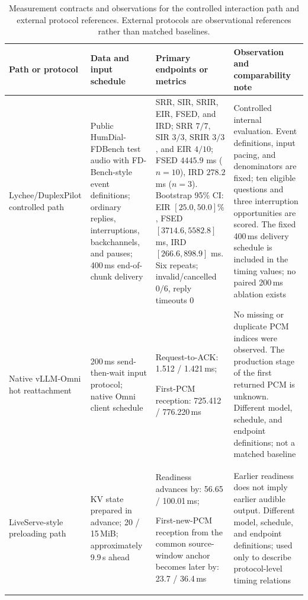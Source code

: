 \documentclass{article}
\begin{document}
\begin{table}[t]
\centering
\caption{Measurement contracts and observations for the controlled
interaction path and external protocol references. External protocols
are observational references rather than matched baselines.}
\label{tab:interaction_protocol}
\scriptsize
\setlength{\tabcolsep}{4pt}
\begin{tabular}{p{}
                p{}
                p{}
                p{}}
\toprule
Path or protocol
& Data and input schedule
& Primary endpoints or metrics
& Observation and comparability note \\
\midrule

Lychee/DuplexPilot
controlled path
&
Public HumDial-FDBench test audio with
FD-Bench-style event definitions; ordinary replies,
interruptions, backchannels, and pauses;
400\,ms end-of-chunk delivery
&
SRR, SIR, SRIR, EIR, FSED, and IRD;
SRR $7/7$, SIR $3/3$, SRIR $3/3$, and
EIR $4/10$; FSED $4445.9$ ms ($n=10$),
IRD $278.2$ ms ($n=3$). Bootstrap 95\%
CI: EIR $[25.0,50.0]\%$, FSED
$[3714.6,5582.8]$ ms, IRD
$[266.6,898.9]$ ms. Six repeats;
invalid/cancelled $0/6$, reply timeouts $0$
&
Controlled internal evaluation.
Event definitions, input pacing, and
denominators are fixed; ten eligible
questions and three interruption
opportunities are scored. The fixed 400\,ms
delivery schedule is included in the timing
values; no paired 200\,ms ablation exists \\

Native vLLM-Omni
hot reattachment
&
200\,ms send-then-wait input protocol;
native Omni client schedule
&
Request-to-ACK:
1.512 / 1.421\,ms;

First-PCM reception:
725.412 / 776.220\,ms
&
No missing or duplicate PCM indices were
observed. The production stage of the
first returned PCM is unknown. Different
model, schedule, and endpoint definitions;
not a matched baseline \\

LiveServe-style
preloading path
&
KV state prepared in advance;
20 / 15\,MiB;
approximately 9.9\,s ahead
&
Readiness advances by:
56.65 / 100.01\,ms;

First-new-PCM reception from the common
source-window anchor becomes later by:
23.7 / 36.4\,ms
&
Earlier readiness does not imply earlier
audible output. Different model, schedule,
and endpoint definitions; used only to
describe protocol-level timing relations \\
\bottomrule
\end{tabular}
\end{table}
\end{document}

